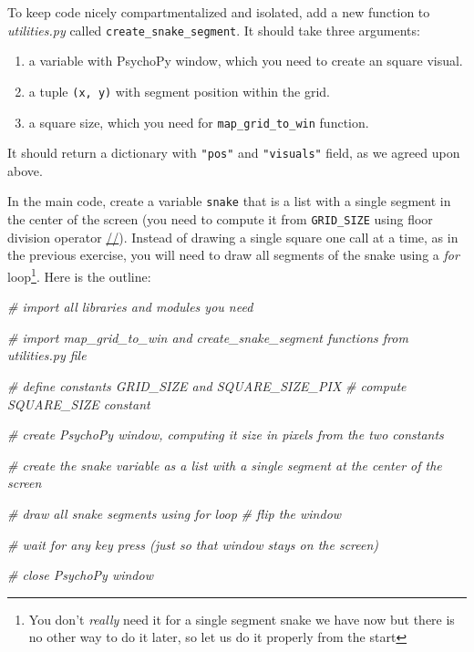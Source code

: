 \documentclass[
]{book}
\newenvironment{Shaded}{\begin{snugshade}}{\end{snugshade}}
\newcommand{\CommentTok}[1]{\textcolor[rgb]{0.56,0.35,0.01}{\textit{#1}}}
\providecommand{\tightlist}{%
  \setlength{\itemsep}{0pt}\setlength{\parskip}{0pt}}
\begin{document}
To keep code nicely compartmentalized and isolated, add a new function to \emph{utilities.py} called \texttt{create\_snake\_segment}. It should take three arguments:

\begin{enumerate}
\def\labelenumi{\arabic{enumi}.}
\tightlist
\item
  a variable with PsychoPy window, which you need to create an square visual.
\item
  a tuple \texttt{(x,\ y)} with segment position within the grid.
\item
  a square size, which you need for \texttt{map\_grid\_to\_win} function.
\end{enumerate}

It should return a dictionary with \texttt{"pos"} and \texttt{"visuals"} field, as we agreed upon above.

In the main code, create a variable \texttt{snake} that is a list with a single segment in the center of the screen (you need to compute it from \texttt{GRID\_SIZE} using floor division operator \href{https://python-reference.readthedocs.io/en/latest/docs/operators/floor_division.html}{//}). Instead of drawing a single square one call at a time, as in the previous exercise, you will need to draw all segments of the snake using a \emph{for} loop\footnote{You don't \emph{really} need it for a single segment snake we have now but there is no other way to do it later, so let us do it properly from the start}. Here is the outline:

\begin{Shaded}
\begin{Highlighting}[]
\CommentTok{\# import all libraries and modules you need}

\CommentTok{\# import map\_grid\_to\_win and create\_snake\_segment functions from utilities.py file}

\CommentTok{\# define constants GRID\_SIZE and SQUARE\_SIZE\_PIX}
\CommentTok{\# compute SQUARE\_SIZE constant}

\CommentTok{\# create PsychoPy window, computing it size in pixels from the two constants}

\CommentTok{\# create the snake variable as a list with a single segment at the center of the screen }


\CommentTok{\# draw all snake segments using for loop  }
\CommentTok{\# flip the window}

\CommentTok{\# wait for any key press (just so that window stays on the screen)}

\CommentTok{\# close PsychoPy window}
\end{Highlighting}
\end{Shaded}
\end{document}
